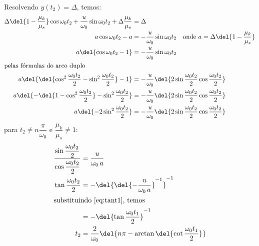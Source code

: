\documentclass[]{IMTexam}
\begin{document}
\begin{questions}
\begin{parts}
		\begin{solution}
			Resolvendo $ y(t_2)=\Delta $, temos:
			\begin{align*}
				\Delta\del{1-\dfrac{\mu_k}{\mu_s}}\cos\omega_0t_2+\dfrac{u}{\omega_0}\sin\omega_0t_2+\Delta\dfrac{\mu_k}{\mu_s} & =\Delta                                                                                   \\
				a\cos\omega_0t_2-a                                                                                              & =-\dfrac{u}{\omega_0}\sin\omega_0t_2\quad\text{onde }a=\Delta\del{1-\dfrac{\mu_k}{\mu_s}} \\
				a\del{\cos\omega_0t_2-1}                                                                                        & =-\dfrac{u}{\omega_0}\sin\omega_0t_2                                                      \\
				\intertext{pelas fórmulas do arco duplo}
				a\del{\del{\cos^{2}\dfrac{\omega_0t_2}{2}-\sin^{2}\dfrac{\omega_0t_2}{2}}-1}                                    & =-\dfrac{u}{\omega_0}\del{2\sin\dfrac{\omega_0t_2}{2}\cos\dfrac{\omega_0t_2}{2}}          \\
				a\del{-\del{1-\cos^{2}\dfrac{\omega_0t_2}{2}}-\sin^{2}\dfrac{\omega_0t_2}{2}}                                   & =-\dfrac{u}{\omega_0}\del{2\sin\dfrac{\omega_0t_2}{2}\cos\dfrac{\omega_0t_2}{2}}          \\
				a\del{-2\sin^{2}\dfrac{\omega_0t_2}{2}}                                                                         & =-\dfrac{u}{\omega_0}\del{2\sin\dfrac{\omega_0t_2}{2}\cos\dfrac{\omega_0t_2}{2}}
			\end{align*}
			para $ t_2\neq n\dfrac{\pi}{\omega_0} $ e $ \dfrac{\mu_k}{\mu_s}\neq1 $:
			\begin{align*}
				\dfrac{\sin\dfrac{\omega_0t_2}{2}}{\cos\dfrac{\omega_0t_2}{2}} & =\dfrac{u}{\omega_0\,a}                                                \\
				\tan\dfrac{\omega_0t_2}{2}                                     & =-\del{\del{-\dfrac{u}{\omega_0\,a}}^{-1}}^{-1}                        \\
				\intertext{substituindo \ref{eq:tant1}, temos}
				                                                               & =-\del{\tan\dfrac{\omega_0t_1}{2}}^{-1}                                \\
				t_2                                                            & =\dfrac{2}{\omega_0}\del{n\pi-\arctan\del{\cot\dfrac{\omega_0t_1}{2}}} \\
			\end{align*}


\end{solution}
\end{parts}
\end{questions}
\end{document}
